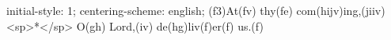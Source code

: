 initial-style: 1;
centering-scheme: english;
(f3)At(fv) thy(fe) com(hijv)ing,(jiiv) <sp>*</sp> O(gh) Lord,(iv) de(hg)liv(f)er(f) us.(f)
